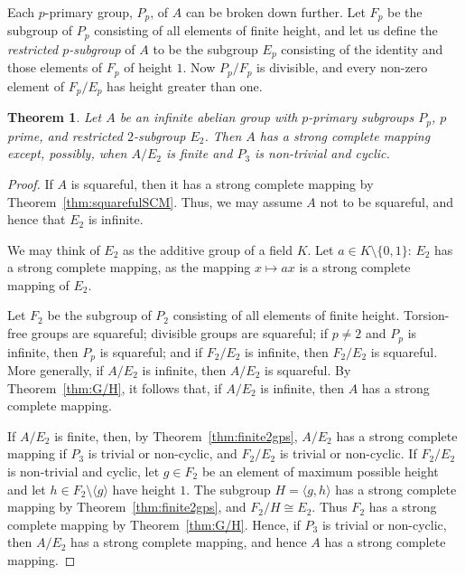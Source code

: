 \documentclass[12pt,a4paper]{article}
\newtheorem{thm}{Theorem}[section]
\begin{document}
Each $p$-primary group, $P_p$, of $A$ can be broken down further. Let $F_p$ be the subgroup of $P_p$ consisting of all elements of finite height, and let us define the {\em restricted $p$-subgroup} of $A$ to be the subgroup $E_p$ consisting of the identity and those elements of $F_p$ of height $1$. Now $P_p/F_p$ is divisible, and every non-zero element of $F_p/E_p$ has height greater than one. 


\begin{thm}\label{thm:InftyAbSCM}
Let $A$ be an infinite abelian group with $p$-primary subgroups $P_p$, $p$ prime, and restricted $2$-subgroup $E_2$. Then $A$ has a strong complete mapping except, possibly, when $A/E_2$ is finite and $P_3$ is non-trivial and cyclic.
\end{thm}
\begin{proof}
If $A$ is squareful, then it has a strong complete mapping by Theorem~\ref{thm:squarefulSCM}. Thus, we may assume $A$ not to be squareful, and hence that $E_2$ is infinite. 

We may think of $E_2$ as the additive group of a field $K$. Let $a\in K\setminus\{0,1\}$: $E_2$ has a strong complete mapping, as the mapping $x\mapsto ax$ is a strong complete mapping of $E_2$.

Let $F_2$ be the subgroup of $P_2$ consisting of all elements of finite height. Torsion-free groups are squareful; divisible groups are squareful; if $p\ne 2$ and $P_p$ is infinite, then $P_p$ is squareful; and if $F_2/E_2$ is infinite, then $F_2/E_2$ is squareful. More generally, if $A/E_2$ is infinite, then $A/E_2$ is squareful. By Theorem~\ref{thm:G/H}, it follows that, if $A/E_2$ is infinite, then $A$ has a strong complete mapping.

If $A/E_2$ is finite, then, by Theorem~\ref{thm:finite2gps}, $A/E_2$ has a strong complete mapping if $P_3$ is trivial or non-cyclic, and $F_2/E_2$ is trivial or non-cyclic. If $F_2/E_2$ is non-trivial and cyclic, let $g\in F_2$ be an element of maximum possible height and let $h\in F_2\setminus\langle g\rangle$ have height $1$. The subgroup $H=\langle g,h\rangle$ has a strong complete mapping by Theorem~\ref{thm:finite2gps}, and $F_2/H\cong E_2$. Thus $F_2$ has a strong complete mapping by Theorem~\ref{thm:G/H}. Hence, if $P_3$ is trivial or non-cyclic, then $A/E_2$ has a strong complete mapping, and hence $A$ has a strong complete mapping.
\end{proof}
\end{document}
